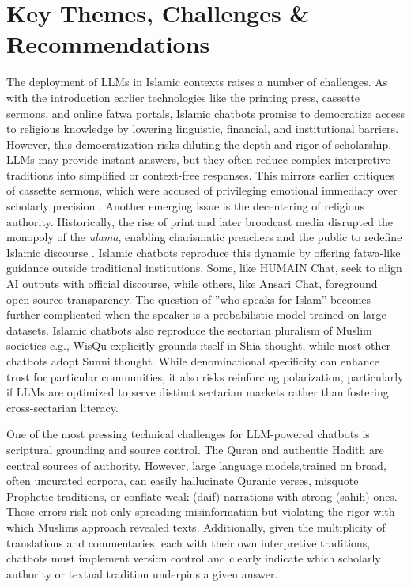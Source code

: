 \documentclass{article}
\begin{document}
\section{Key Themes, Challenges \& Recommendations}
The deployment of LLMs in Islamic contexts raises a number of challenges. As with the introduction earlier technologies like the printing press, cassette sermons, and online fatwa portals, Islamic chatbots promise to democratize access to religious knowledge by lowering linguistic, financial, and institutional barriers. However, this democratization risks diluting the depth and rigor of scholarship. LLMs may provide instant answers, but they often reduce complex interpretive traditions into simplified or context-free responses. This mirrors earlier critiques of cassette sermons, which were accused of privileging emotional immediacy over scholarly precision \citep{hirschkind2006}. Another emerging issue is the decentering of religious authority. Historically, the rise of print and later broadcast media disrupted the monopoly of the \textit{ulama}, enabling charismatic preachers and the public to redefine Islamic discourse \citep{messick1993, armbrust1996}. Islamic chatbots reproduce this dynamic by offering fatwa-like guidance outside traditional institutions. Some, like HUMAIN Chat, seek to align AI outputs with official discourse, while others, like Ansari Chat, foreground open-source transparency. The question of ''who speaks for Islam'' becomes further complicated when the speaker is a probabilistic model trained on large datasets. Islamic chatbots also reproduce the sectarian pluralism of Muslim societies e.g., WisQu explicitly grounds itself in Shia thought, while most other chatbots adopt Sunni thought. While denominational specificity can enhance trust for particular communities, it also risks reinforcing polarization, particularly if LLMs are optimized to serve distinct sectarian markets rather than fostering cross-sectarian literacy.

One of the most pressing technical challenges for LLM-powered chatbots is scriptural grounding and source control. The Quran and authentic Hadith are central sources of authority. However, large language models,trained on broad, often uncurated corpora, can easily hallucinate Quranic verses, misquote Prophetic traditions, or conflate weak (daif) narrations with strong (sahih) ones. These errors risk not only spreading misinformation but violating the rigor with which Muslims approach revealed texts. Additionally, given the multiplicity of translations and commentaries, each with their own interpretive traditions, chatbots must implement version control and clearly indicate which scholarly authority or textual tradition underpins a given answer. 
\end{document}

